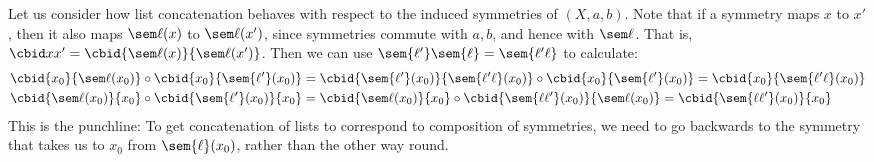 \begin{remark}\label{rem:bicycle-list-concat}
Let us consider how list concatenation behaves with respect
to the induced symmetries of $(X,a,b)$.
Note that if a symmetry maps $x$ to $x'$,
then it also maps $\sem\ell(x)$ to $\sem\ell(x')$,
since symmetries commute with $a,b$, and hence with $\sem\ell$.
That is, $\cbid x{x'} = \cbid{\sem\ell(x)}{\sem\ell(x')}$.
Then we can use $\sem{\ell'}\sem{\ell} = \sem{\ell'\ell}$ to calculate:
\begin{align*}
  \cbid{x_0}{\sem\ell(x_0)} \circ \cbid{x_0}{\sem{\ell'}(x_0)}
  &= \cbid{\sem{\ell'}(x_0)}{\sem{\ell'\ell}(x_0)} \circ \cbid{x_0}{\sem{\ell'}(x_0)}
  = \cbid{x_0}{\sem{\ell'\ell}(x_0)} \\
  \cbid{\sem\ell(x_0)}{x_0} \circ \cbid{\sem{\ell'}(x_0)}{x_0}
  &= \cbid{\sem\ell(x_0)}{x_0} \circ \cbid{\sem{\ell\ell'}(x_0)}{\sem\ell(x_0)}
  = \cbid{\sem{\ell\ell'}(x_0)}{x_0}
\end{align*}
This is the punchline: To get concatenation of lists
to correspond to composition of symmetries, we need
to go backwards to the symmetry that takes us to $x_0$
from $\sem{\ell}(x_0)$, rather than the other way round.
\end{remark}

\begin{marginfigure}
  \caption{A frieze pattern with infinite dihedral symmetry.}
  \label{fig:first-frieze}
\end{marginfigure}

